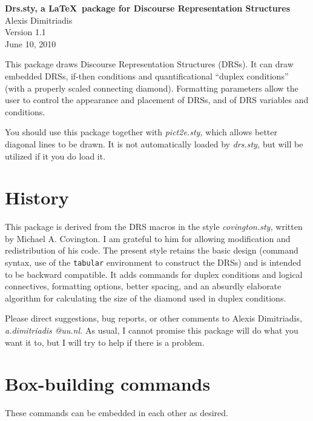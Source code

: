 \documentclass[11pt]{article}
\begin{document}
\begin{center}
{\bfseries Drs.sty, a \LaTeX\ package for  Discourse Representation Structures} 
\\[6pt]
Alexis Dimitriadis \\[6pt]
Version 1.1\\[6pt]
June 10, 2010 \\[1.5ex]
\end{center}

\noindent 
This package draws Discourse Representation Structures (DRSs).  It can draw
embedded DRSs, if-then conditions and quantificational ``duplex conditions''
(with a properly scaled connecting diamond).  Formatting parameters allow the
user to control the appearance and placement of DRSs, and of DRS variables and
conditions.

You should use this package together with \emph{pict2e.sty,} which allows better diagonal lines to be drawn. It is not automatically loaded by \emph{drs.sty,} but will be utilized if it you do load it.

\section{History}

This package is derived from the DRS macros in the style \emph{covington.sty,}
written by Michael A. Covington.  I am grateful to him for allowing
modification and redistribution of his code.  The present style retains the
basic design (command syntax, use of the \verb|tabular| environment to
construct the DRSs) and is intended to be backward compatible.  It 
adds commands for duplex conditions and logical connectives, formatting
options, better spacing, and an absurdly elaborate algorithm for calculating
the size of the diamond used in duplex conditions.

Please direct suggestions, bug reports, or other comments to Alexis
Dimitriadis, \emph{a.dimitriadis} \emph{@uu.nl.}
As usual, 
I cannot promise this package will do what you want it to, but I will 
try to help if there is a problem.


\section{Box-building commands}
These commands can be embedded in each other as desired.  
\end{document}

